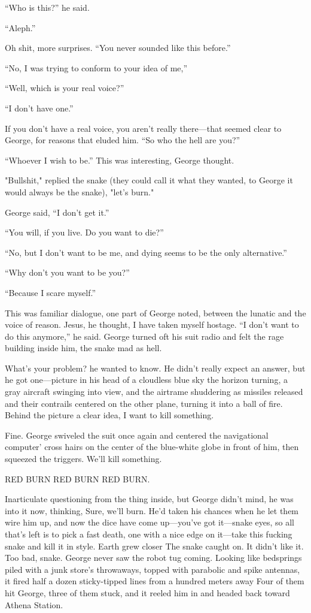 “Who is this?” he said.

“Aleph.”

Oh shit, more surprises. “You never sounded like this before.”

“No, I was trying to conform to your idea of me,”

“Well, which is your real voice?”

“I don’t have one.”

If you don’t have a real voice, you aren’t really there—that seemed clear to George, for reasons that eluded him. “So who the hell are you?”

“Whoever I wish to be.” This was interesting, George thought.

"Bullshit," replied the snake (they could call it what they wanted, to George it would always be the snake), "let’s burn."

George said, “I don’t get it.”

“You will, if you live. Do you want to die?”

“No, but I don’t want to be me, and dying seems to be the only alternative.”

“Why don’t you want to be you?”

“Because I scare myself.”

This was familiar dialogue, one part of George noted, between the lunatic and the voice of reason. Jesus, he thought, I have taken myself hostage. “I don’t want to do this anymore,” he said. George turned oft his suit radio and felt the rage building inside him, the snake mad as hell.

What’s your problem? he wanted to know. He didn’t really expect an answer, but he got one—picture in his head of a cloudless blue sky the horizon turning, a gray aircraft swinging into view, and the airtrame shuddering as missiles released and their contrails centered on the other plane, turning it into a ball of fire. Behind the picture a clear idea, I want to kill something.

Fine. George swiveled the suit once again and centered the navigational computer’ cross hairs on the center of the blue-white globe in front of him, then squeezed the triggers. We’ll kill something.

RED BURN RED BURN RED BURN.

Inarticulate questioning from the thing inside, but George didn’t mind, he was into it now, thinking, Sure, we’ll burn. He’d taken his chances when he let them wire him up, and now the dice have come up—you’ve got it—snake eyes, so all that’s left is to pick a fast death, one with a nice edge on it—take this fucking snake and kill it in style. Earth grew closer The snake caught on. It didn’t like it. Too bad, snake. George never saw the robot tug coming. Looking like bedsprings piled with a junk store’s throwaways, topped with parabolic and spike antennas, it fired half a dozen sticky-tipped lines from a hundred meters away Four of them hit George, three of them stuck, and it reeled him in and headed back toward Athena Station.

